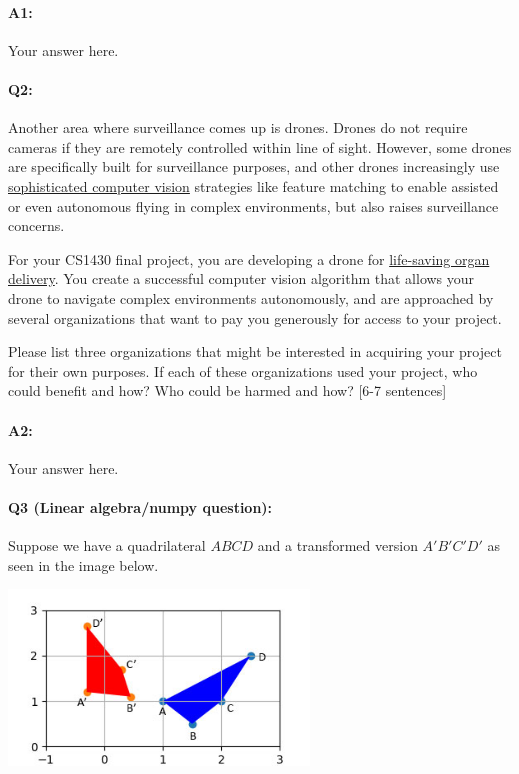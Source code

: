 \paragraph{A1:} Your answer here.


\pagebreak
\paragraph{Q2:} Another area where surveillance comes up is drones. Drones do not require cameras if they are remotely controlled within line of sight. However, some drones are specifically built for surveillance purposes, and other drones increasingly use \href{https://link.springer.com/article/10.1007/s10846-017-0483-z}{sophisticated computer vision} strategies like feature matching to enable assisted or even autonomous flying in complex environments, but also raises surveillance concerns. 

For your CS1430 final project, you are developing a drone for \href{https://www.cnn.com/2019/05/01/health/drone-organ-transplant-bn-trnd/index.html}{life-saving organ delivery}. You create a successful computer vision algorithm that allows your drone to navigate complex environments autonomously, and are approached by several organizations that want to pay you generously for access to your project.

Please list three organizations that might be interested in acquiring your project for their own purposes. If each of these organizations used your project, who could benefit and how? Who could be harmed and how? [6-7 sentences]

\paragraph{A2:} Your answer here.



\pagebreak
\paragraph{Q3 (Linear algebra/numpy question):}
Suppose we have a quadrilateral $ABCD$ and a transformed version $A'B'C'D'$ as seen in the image below.

\includegraphics[width=8cm]{quadrilaterals.jpg}

